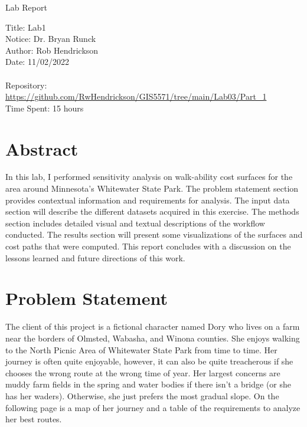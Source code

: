 \documentclass[article,12pt]{article}
\numberwithin{equation}{section}
\begin{document}
\begin{center}
Lab Report

Title: Lab1\\
Notice: Dr. Bryan Runck\\
Author: Rob Hendrickson\\
Date: 11/02/2022\\~\\

Repository: \url{https://github.com/RwHendrickson/GIS5571/tree/main/Lab03/Part_1}\\
Time Spent: 15 hours

\end{center}

\section*{Abstract}
In this lab, I performed sensitivity analysis on walk-ability cost surfaces for the area around Minnesota's Whitewater State Park. The problem statement section provides contextual information and requirements for analysis. The input data section will describe the different datasets acquired in this exercise. The methods section includes detailed visual and textual descriptions of the workflow conducted. The results section will present some visualizations of the surfaces and cost paths that were computed. This report concludes with a discussion on the lessons learned and future directions of this work.


\section{Problem Statement}
The client of this project is a fictional character named Dory who lives on a farm near the borders of Olmsted, Wabasha, and Winona counties. She enjoys walking to the North Picnic Area of Whitewater State Park from time to time. Her journey is often quite enjoyable, however, it can also be quite treacherous if she chooses the wrong route at the wrong time of year. Her largest concerns are muddy farm fields in the spring and water bodies if there isn't a bridge (or she has her waders). Otherwise, she just prefers the most gradual slope. On the following page is a map of her journey and a table of the requirements to analyze her best routes.
\end{document}
